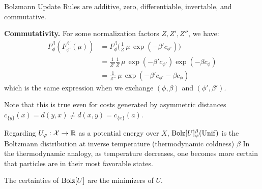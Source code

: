 \begin{prop}
	Bolzmann Update Rules are additive, zero, differentiable, invertable, and commutative.
\end{prop}

\begin{lproof}
	\textbf{Commutativity.}
	For some normalization factors $Z, Z', Z''$, we have:
	\begin{align*}
		 F^\beta_\phi( F^{\beta'}_{\phi'}(\mu))
		 &= F^\beta_\phi \Big( \frac{1}{Z} \,\mu\, \exp(- \beta' c_{\phi'}) \Big) \\
		 &= \frac{1}{Z'} \frac{1}{Z} \,\mu\, \exp(- \beta' c_{\phi'}) \exp(- \beta c_{\phi}) \\
		 &= \frac{1}{Z''} \,\mu\, \exp(-\beta' c_{\phi'} - \beta c_\phi)
	\end{align*}
	which is the same expression when we exchange $(\phi, \beta)$ and $(\phi', \beta')$.
\end{lproof}

Note that this is true even for costs generated by asymmetric distances $c_{\{y\}}(x) = d(y, x) \ne d(x,y) = c_{\{x\}}(a)$.


\begin{remark}
	Regarding $U_\varphi : \mathcal X \to \mathbb R$ as a potential energy over $X$,
	$\mathrm{Bolz}[U]^\beta_\varphi(\mathrm{Unif})$ is the Boltzmann distribution at inverse temperature (thermodynamic coldness) $\beta$
	In the thermodynamic analogy, as temperature decreases, one becomes more certain that particles are in their most favorable states.
\end{remark}


The certainties of $\mathrm{Bolz}[U]$ are the minimizers of $U$.




